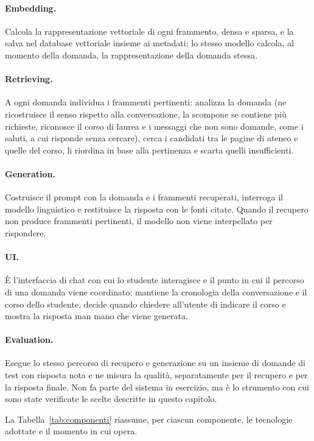 \paragraph{Embedding.} Calcola la rappresentazione vettoriale di ogni frammento, densa e sparsa, e la salva nel
database vettoriale insieme ai metadati; lo stesso modello calcola, al momento della domanda, la rappresentazione
della domanda stessa.

\paragraph{Retrieving.} A ogni domanda individua i frammenti pertinenti: analizza la domanda (ne ricostruisce il
senso rispetto alla conversazione, la scompone se contiene più richieste, riconosce il corso di laurea e i
messaggi che non sono domande, come i saluti, a cui risponde senza cercare), cerca i
candidati tra le pagine di ateneo e quelle del corso, li riordina in base alla pertinenza e scarta quelli
insufficienti.

\paragraph{Generation.} Costruisce il prompt con la domanda e i frammenti recuperati, interroga il modello
linguistico e restituisce la risposta con le fonti citate. Quando il recupero non produce frammenti pertinenti, il
modello non viene interpellato per rispondere.

\paragraph{UI.} È l'interfaccia di chat con cui lo studente interagisce e il punto in cui il percorso di una domanda
viene coordinato: mantiene la cronologia della conversazione e il corso dello studente, decide quando chiedere
all'utente di indicare il corso e mostra la risposta man mano che viene generata.

\paragraph{Evaluation.} Esegue lo stesso percorso di recupero e generazione su un insieme di domande di test con
risposta nota e ne misura la qualità, separatamente per il recupero e per la risposta finale. Non fa parte del
sistema in esercizio, ma è lo strumento con cui sono state verificate le scelte descritte in questo capitolo.

\medskip
\noindent La Tabella~\ref{tab:componenti} riassume, per ciascun componente, le tecnologie adottate e il momento in
cui opera.

